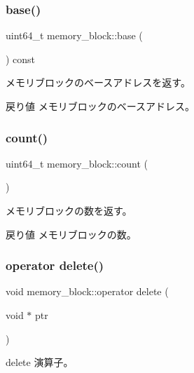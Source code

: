 \subsubsection{\texorpdfstring{base()}{base()}\hspace{0.1cm}{\footnotesize\ttfamily [2/2]}}
{\footnotesize\ttfamily uint64\+\_\+t memory\+\_\+block\+::base (\begin{DoxyParamCaption}{ }\end{DoxyParamCaption}) const}

メモリブロックのベースアドレスを返す。 \begin{DoxyReturn}{戻り値}
メモリブロックのベースアドレス。 
\end{DoxyReturn}
\hypertarget{classmemory__block_a8573ce38e735adf5fbf8a04165308c74}{}\label{classmemory__block_a8573ce38e735adf5fbf8a04165308c74} 
\subsubsection{\texorpdfstring{count()}{count()}}
{\footnotesize\ttfamily uint64\+\_\+t memory\+\_\+block\+::count (\begin{DoxyParamCaption}{ }\end{DoxyParamCaption})\hspace{0.3cm}{\ttfamily [static]}}

メモリブロックの数を返す。 \begin{DoxyReturn}{戻り値}
メモリブロックの数。 
\end{DoxyReturn}
\hypertarget{classmemory__block_ad053b85f1ebbd81d801dc7e492fd4264}{}\label{classmemory__block_ad053b85f1ebbd81d801dc7e492fd4264} 
\subsubsection{\texorpdfstring{operator delete()}{operator delete()}}
{\footnotesize\ttfamily void memory\+\_\+block\+::operator delete (\begin{DoxyParamCaption}\item[{void $\ast$}]{ptr }\end{DoxyParamCaption})\hspace{0.3cm}{\ttfamily [static]}}

delete 演算子。 \hypertarget{classmemory__block_a649a913a12355b1e28e0338f64f346d8}{}\label{classmemory__block_a649a913a12355b1e28e0338f64f346d8} 
